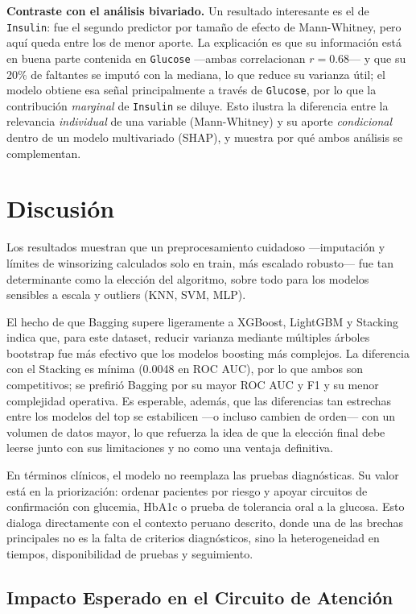 \documentclass[conference]{IEEEtran}
\newcommand{\code}[1]{\texttt{#1}}
\begin{document}
\textbf{Contraste con el análisis bivariado.} Un resultado interesante es el de \code{Insulin}: fue el segundo predictor por tamaño de efecto de Mann-Whitney, pero aquí queda entre los de menor aporte. La explicación es que su información está en buena parte contenida en \code{Glucose} ---ambas correlacionan $r=0.68$--- y que su 20\% de faltantes se imputó con la mediana, lo que reduce su varianza útil; el modelo obtiene esa señal principalmente a través de \code{Glucose}, por lo que la contribución \emph{marginal} de \code{Insulin} se diluye. Esto ilustra la diferencia entre la relevancia \emph{individual} de una variable (Mann-Whitney) y su aporte \emph{condicional} dentro de un modelo multivariado (SHAP), y muestra por qué ambos análisis se complementan.

\section{Discusión}

Los resultados muestran que un preprocesamiento cuidadoso ---imputación y límites de winsorizing calculados solo en train, más escalado robusto--- fue tan determinante como la elección del algoritmo, sobre todo para los modelos sensibles a escala y outliers (KNN, SVM, MLP).

El hecho de que Bagging supere ligeramente a XGBoost, LightGBM y Stacking indica que, para este dataset, reducir varianza mediante múltiples árboles bootstrap fue más efectivo que los modelos boosting más complejos. La diferencia con el Stacking es mínima (0.0048 en ROC AUC), por lo que ambos son competitivos; se prefirió Bagging por su mayor ROC AUC y F1 y su menor complejidad operativa. Es esperable, además, que las diferencias tan estrechas entre los modelos del top se estabilicen ---o incluso cambien de orden--- con un volumen de datos mayor, lo que refuerza la idea de que la elección final debe leerse junto con sus limitaciones y no como una ventaja definitiva.

En términos clínicos, el modelo no reemplaza las pruebas diagnósticas. Su valor está en la priorización: ordenar pacientes por riesgo y apoyar circuitos de confirmación con glucemia, HbA1c o prueba de tolerancia oral a la glucosa. Esto dialoga directamente con el contexto peruano descrito, donde una de las brechas principales no es la falta de criterios diagnósticos, sino la heterogeneidad en tiempos, disponibilidad de pruebas y seguimiento.

\subsection{Impacto Esperado en el Circuito de Atención}
\label{sec:impacto}
\end{document}
